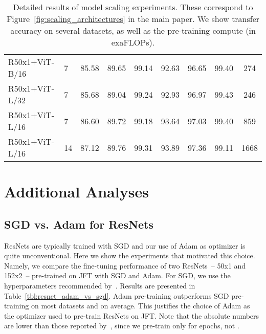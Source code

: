 \begin{table}[]
{\begin{tabular}{llccccccc}
R50x1+ViT-B/16 &       7 &     85.58 &          89.65 &     99.14 &      92.63 & 96.65 &    99.40 &       274 \\
R50x1+ViT-L/32 &       7 &     85.68 &          89.04 &     99.24 &      92.93 & 96.97 &    99.43 &       246 \\
R50x1+ViT-L/16 &       7 &     86.60 &          89.72 &     99.18 &      93.64 & 97.03 &    99.40 &       859 \\
R50x1+ViT-L/16 &      14 &     87.12 &          89.76 &     99.31 &      93.89 & 97.36 &    99.11 &      1668 \\
\bottomrule
\end{tabular}
}
\caption{Detailed results of model scaling experiments. These correspond to Figure~\ref{fig:scaling_architectures} in the main paper. We show transfer accuracy on several datasets, as well as the pre-training compute (in exaFLOPs).}
\label{tbl:scaling_architectures}
\end{table}


\section{Additional Analyses}
\label{sec:additional_analyses}

\subsection{SGD vs. Adam for ResNets}
\label{sec:sgd_vs_adam}

ResNets are typically trained with SGD and our use of Adam as optimizer is quite unconventional.
Here we show the experiments that motivated this choice.
Namely, we compare the fine-tuning performance of two ResNets~-- 50x1 and 152x2~-- pre-trained on JFT with SGD and Adam.
For SGD, we use the hyperparameters recommended by~\citet{kolesnikov2020-bit}.
Results are presented in Table~\ref{tbl:resnet_adam_vs_sgd}.
Adam pre-training outperforms SGD pre-training on most datasets and on average.
This justifies the choice of Adam as the optimizer used to pre-train ResNets on JFT.
Note that the absolute numbers are lower than those reported by~\citet{kolesnikov2020-bit}, since we pre-train only for  epochs, not .

